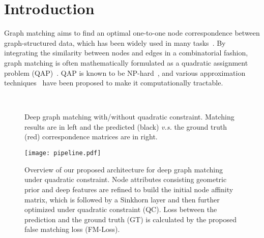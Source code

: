 \documentclass[final]{cvpr}
\begin{document}
\section{Introduction}
Graph matching aims to find an optimal one-to-one node correspondence between graph-structured data, which has been widely used in many tasks~\cite{berg2005shape,brendel2011learning,conte2004thirty,gasse2019exact,jiang2010linear,szeliski2010computer}. By integrating the similarity between nodes and edges in a combinatorial fashion, graph matching is often mathematically formulated as a quadratic assignment problem (QAP)~\cite{loiola2007survey}. QAP is known to be NP-hard~\cite{hartmanis1982computers}, and various approximation techniques~\cite{leordeanu2005spectral,leordeanu2009integer,liu2014graph,schellewald2001evaluation} have been proposed to make it computationally tractable.

\begin{figure}[t!]
\centering
{}\\
\vspace{-3mm}
\caption{Deep graph matching with/without quadratic constraint. Matching results are in left and the predicted (black) {\em v.s.} the ground truth (red) correspondence matrices are in right.}
\vspace{-3mm}
\label{fig:QC}
\end{figure}

\begin{figure*}[t]
\centering
   \texttt{[image: pipeline.pdf]}
\caption{Overview of our proposed architecture for deep graph matching under quadratic constraint. Node attributes consisting geometric prior and deep features are refined to build the initial node affinity matrix, which is followed by a Sinkhorn layer and then further optimized under quadratic constraint (QC). Loss between the prediction and the ground truth (GT) is calculated by the proposed false matching loss (FM-Loss).}
   \vspace{-3mm}
\label{fig:overview}
\end{figure*}
\end{document}

